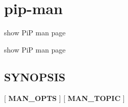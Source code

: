 \hypertarget{group__pip-man}{\section{pip-\/man}
\label{group__pip-man}
}


show Pi\-P man page  


show Pi\-P man page \hypertarget{group__piplnlibs_synopsis}{}\subsection{S\-Y\-N\-O\-P\-S\-I\-S}\label{group__piplnlibs_synopsis}
{ }\mbox{[} {\bfseries M\-A\-N\-\_\-\-O\-P\-T\-S} \mbox{]} \mbox{[} {\bfseries M\-A\-N\-\_\-\-T\-O\-P\-I\-C} \mbox{]} 